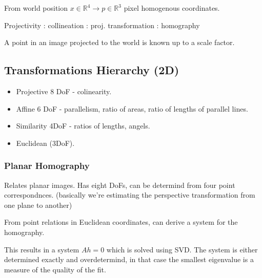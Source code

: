 From world position $x \in \mathbb{R}^4 \to p \in \mathbb R^3$ pixel homogenous coordinates. 

Projectivity : collineation :  proj. transformation : homography

A point in an image projected to the world is known up to a scale factor.

\subsection{Transformations Hierarchy (2D)}

\begin{itemize}
\item Projective 8 DoF - colinearity.
\item Affine 6 DoF - parallelism, ratio of areas, ratio of lengths of parallel lines.
\item Similarity 4DoF - ratios of lengths, angels.
\item Euclidean (3DoF).
\end{itemize}



\subsubsection{Planar Homography}

Relates planar images. Has eight DoFs, can be determind from four point correspondnces.
(basically we're estimating the perspective transformation from one plane to another)

From point relations in Euclidean coordinates, can derive a system for the homography. 

This results in a system $Ah = 0$ which is solved using SVD. 
The system is either determined exactly and overdetermind, in that case the smallest eigenvalue is a measure of the quality of the fit.

